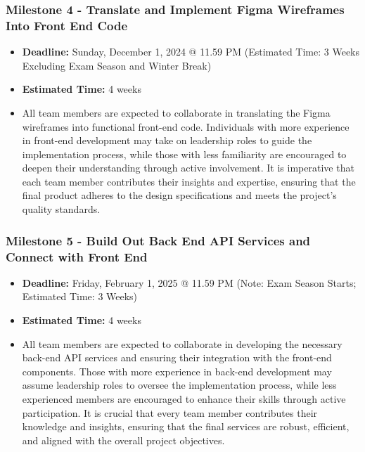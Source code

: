 \documentclass{article}
\begin{document}
\subsubsection*{Milestone 4 - Translate and Implement Figma Wireframes Into Front End Code}
\begin{itemize}
    \item \textbf{Deadline:} Sunday, December 1, 2024 @ 11.59 PM (Estimated
    Time: 3 Weeks Excluding Exam Season and Winter Break)
    \item \textbf{Estimated Time:} 4 weeks
    \item All team members are expected to collaborate in translating the Figma
    wireframes into functional front-end code. Individuals with more experience
    in front-end development may take on leadership roles to guide the
    implementation process, while those with less familiarity are encouraged to
    deepen their understanding through active involvement. It is imperative that
    each team member contributes their insights and expertise, ensuring that the
    final product adheres to the design specifications and meets the project's
    quality standards.
\end{itemize}

\subsubsection*{Milestone 5 - Build Out Back End API Services and Connect with Front End}
\begin{itemize}
    \item \textbf{Deadline:} Friday, February 1, 2025 @ 11.59 PM (Note: Exam
    Season Starts; Estimated Time: 3 Weeks)
    \item \textbf{Estimated Time:} 4 weeks
    \item All team members are expected to collaborate in developing the
    necessary back-end API services and ensuring their integration with the
    front-end components. Those with more experience in back-end development may
    assume leadership roles to oversee the implementation process, while less
    experienced members are encouraged to enhance their skills through active
    participation. It is crucial that every team member contributes their
    knowledge and insights, ensuring that the final services are robust,
    efficient, and aligned with the overall project objectives.
\end{itemize}
\end{document}

